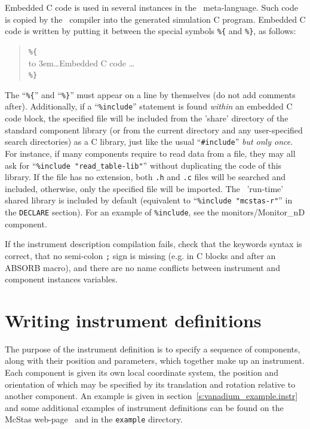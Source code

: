 Embedded C code is used in several instances in the \MCS\
meta-language. Such code is copied by the \MCS\ compiler into the
generated simulation C program. Embedded C code is written by putting it
between the special symbols \verb|%{| and \verb|%}|, as follows:
\begin{quote}
  \verb|%{| \\
  \hbox to 3em{}\ldots Embedded C code \ldots \\
  \verb|%}|
\end{quote} 
The ``\verb|%{|'' and ``\verb|%}|'' must appear on a line by themselves (do not add comments after).
Additionally, if a ``\verb+%include+'' statement is found \emph{within} an embedded C code block, the specified file will be included from the 'share' directory of the standard component library  (or from the
current directory and any user-specified search directories) as a C library, just like the usual ``\verb+#include+'' \emph{but only once}. For instance, if many components require to read data from a file, they may all ask for ``\verb+%include "read_table-lib"+''  without duplicating the code of this library. If the file has no extension, both \verb+.h+ and \verb+.c+ files will be searched and included, otherwise, only the specified file will be imported. The \MCS\ 'run-time' shared
library is included by default (equivalent to ``\verb+%include "mcstas-r"+'' in the \texttt{DECLARE} section). \index{Library!Run-time}
For an
example of \texttt{\%include}, see the monitors/Monitor\_nD component.

If the instrument description compilation fails, check that the
keywords syntax is correct, that no semi-colon \verb+;+ sign is
missing (e.g. in C blocks and after an ABSORB macro), and there are no name conflicts between instrument and component instances variables.


\section{Writing instrument definitions}
\label{s:instrdefs}

The purpose of the instrument definition is to specify a sequence of
components, along with their position and parameters, which together
make up an instrument. Each component is given its own local coordinate
system, the position and orientation of which may be specified by its
translation and rotation relative to another component. An example is
given in section~\ref{s:vanadium_example.instr} and some additional
examples of instrument definitions can be found on the McStas
web-page~\cite{mcstas_webpage} and in the \texttt{example} directory.

